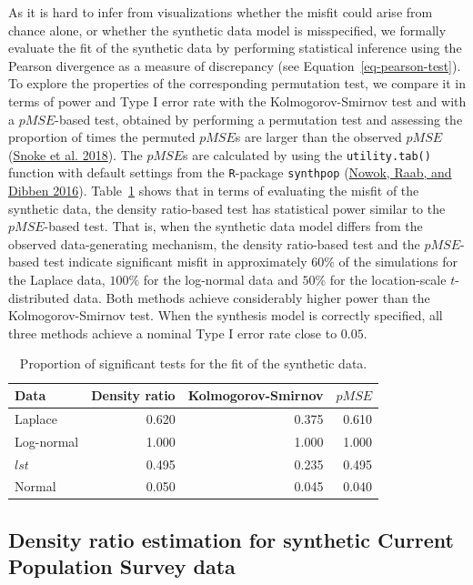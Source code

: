 \documentclass[
]{template/style/uneceart}
\begin{document}
As it is hard to infer from visualizations whether the misfit could
arise from chance alone, or whether the synthetic data model is
misspecified, we formally evaluate the fit of the synthetic data by
performing statistical inference using the Pearson divergence as a
measure of discrepancy (see Equation~\ref{eq-pearson-test}). To explore
the properties of the corresponding permutation test, we compare it in
terms of power and Type I error rate with the Kolmogorov-Smirnov test
and with a \(pMSE\)-based test, obtained by performing a permutation
test and assessing the proportion of times the permuted \(pMSE\)s are
larger than the observed \(pMSE\)
(\protect\hyperlink{ref-snoke_utility_2018}{Snoke et al. 2018}). The
\(pMSE\)s are calculated by using the \texttt{utility.tab()} function
with default settings from the \texttt{R}-package \texttt{synthpop}
(\protect\hyperlink{ref-nowok2016}{Nowok, Raab, and Dibben 2016}).
Table~\ref{tbl-test-pvals} shows that in terms of evaluating the misfit
of the synthetic data, the density ratio-based test has statistical
power similar to the \(pMSE\)-based test. That is, when the synthetic
data model differs from the observed data-generating mechanism, the
density ratio-based test and the \(pMSE\)-based test indicate
significant misfit in approximately \(60\%\) of the simulations for the
Laplace data, \(100\%\) for the log-normal data and \(50\%\) for the
location-scale \(t\)-distributed data. Both methods achieve considerably
higher power than the Kolmogorov-Smirnov test. When the synthesis model
is correctly specified, all three methods achieve a nominal Type I error
rate close to \(0.05\).

\hypertarget{tbl-test-pvals}{}
\begin{table}
\caption{\label{tbl-test-pvals}Proportion of significant tests for the fit of the synthetic data. }\tabularnewline

\centering
\begin{tabular}[t]{lrrr}
\toprule
Data & Density ratio & Kolmogorov-Smirnov & $pMSE$\\
\midrule
Laplace & 0.620 & 0.375 & 0.610\\
Log-normal & 1.000 & 1.000 & 1.000\\
$lst$ & 0.495 & 0.235 & 0.495\\
Normal & 0.050 & 0.045 & 0.040\\
\bottomrule
\end{tabular}
\end{table}

\hypertarget{density-ratio-estimation-for-synthetic-current-population-survey-data}{%
\subsection{Density ratio estimation for synthetic Current Population
Survey
data}\label{density-ratio-estimation-for-synthetic-current-population-survey-data}}
\end{document}
